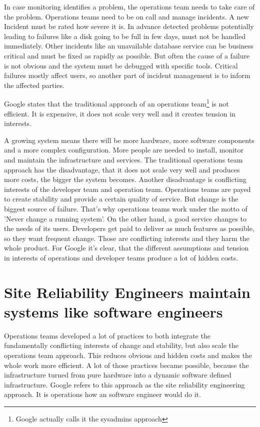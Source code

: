 In case monitoring identifies a problem, the operations team needs to take care of the
problem. Operations teams need to be on call and manage incidents. A new Incident must
be rated how severe it is. In advance detected problems potentially leading to failures
like a disk going to be full in few days, must not be handled immediately. Other
incidents like an unavailable database service can be business critical and must be
fixed as rapidly as possible. But often the cause of a failure is not obvious and the
system must be debugged with specific tools. Critical failures mostly affect users, so
another part of incident management is to inform the affected parties.

Google states that the traditional approach of an operations team\footnote{Google actually
  calls it the sysadmins approach} is not efficient. It is expensive, it does not scale
very well and it creates tension in interests\cite{sre_intro}.

A growing system means there will be more hardware, more software components and a more
complex configuration. More people are needed to install, monitor and maintain the
infrastructure and services. The traditional operations team approach has the
disadvantage, that it does not scale very well and produces more costs, the bigger the
system becomes. Another disadvantage is conflicting interests of the developer team and
operation team. Operations teams are payed to create stability and provide a certain
quality of service. But change is the biggest source of
failure\cite[p.10]{sre_intro}. That's why operations teams work under the motto of 'Never
change a running system'. On the other hand, a good service changes to the needs of its
users. Developers get paid to deliver as much features as possible, so they want frequent
change. Those are conflicting interests and they harm the whole product. For Google it's
clear, that the different assumptions and tension in interests of operations and developer
teams produce a lot of hidden costs.

\section{Site Reliability Engineers maintain systems like software engineers}

Operations teams developed a lot of practices to both integrate the fundamentally
conflicting interests of change and stability, but also scale the operations team
approach. This reduces obvious and hidden costs and makes the whole work more
efficient. A lot of those practices became possible, because the infrastructure turned
from pure hardware into a dynamic software defined infrastructure. Google refers to this
approach as the site reliability engineering approach. It is operations how an software
engineer would do it.

